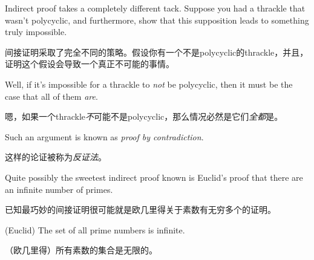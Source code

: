 Indirect proof takes
a completely different tack.  Suppose you had a thrackle that wasn't
polycyclic, and furthermore, show that this supposition leads to something
truly impossible.

间接证明采取了完全不同的策略。假设你有一个不是polycyclic的thrackle，并且，证明这个假设会导致一个真正不可能的事情。

Well, if it's impossible for a thrackle to {\em not} be
polycyclic, then it must be the case that all of them {\em are}.

嗯，如果一个thrackle{\em 不}可能不是polycyclic，那么情况必然是它们{\em 全都}是。

Such an argument is known as 
\emph{proof by contradiction}.

这样的论证被称为\emph{反证法}。

Quite possibly the sweetest indirect proof known is Euclid's proof that there
are an infinite number of primes.

已知最巧妙的间接证明很可能就是欧几里得关于素数有无穷多个的证明。

\begin{thm} (Euclid) The set of all prime numbers is infinite.

      （欧几里得）所有素数的集合是无限的。
\end{thm}

